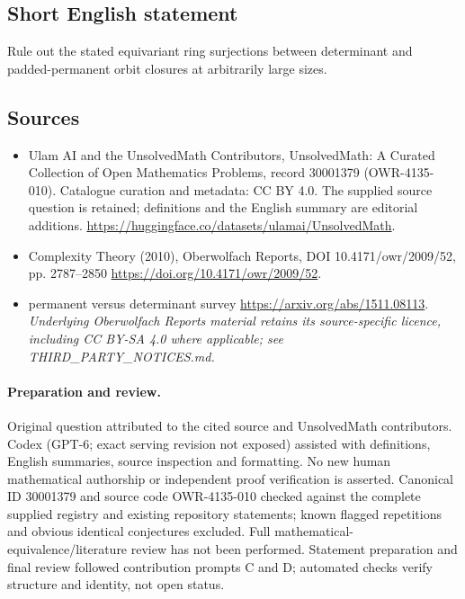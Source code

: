 \documentclass[11pt]{article}
\begin{document}
\subsection{Short English statement}
Rule out the stated equivariant ring surjections between determinant and padded-permanent orbit closures at arbitrarily large sizes.
\subsection{Sources}
\begin{itemize}
\item[\hypertarget{source:30001379:1}{S1}] Ulam AI and the UnsolvedMath Contributors, UnsolvedMath: A Curated Collection of Open Mathematics Problems, record 30001379 (OWR-4135-010). Catalogue curation and metadata: CC BY 4.0. The supplied source question is retained; definitions and the English summary are editorial additions.
\url{https://huggingface.co/datasets/ulamai/UnsolvedMath}.
\item[\hypertarget{source:30001379:2}{S2}] Complexity Theory (2010), Oberwolfach Reports, DOI 10.4171/owr/2009/52, pp. 2787--2850
\url{https://doi.org/10.4171/owr/2009/52}.
\item[\hypertarget{source:30001379:3}{S3}] permanent versus determinant survey
\url{https://arxiv.org/abs/1511.08113}.
\textit{Underlying Oberwolfach Reports material retains its source-specific licence, including CC BY-SA 4.0 where applicable; see THIRD\_PARTY\_NOTICES.md.}
\end{itemize}
\paragraph{Preparation and review.}
Original question attributed to the cited source and UnsolvedMath contributors. Codex (GPT-6; exact serving revision not exposed) assisted with definitions, English summaries, source inspection and formatting. No new human mathematical authorship or independent proof verification is asserted. Canonical ID 30001379 and source code OWR-4135-010 checked against the complete supplied registry and existing repository statements; known flagged repetitions and obvious identical conjectures excluded. Full mathematical-equivalence/literature review has not been performed. Statement preparation and final review followed contribution prompts C and D; automated checks verify structure and identity, not open status.
\label{end:30001379}
\end{document}
